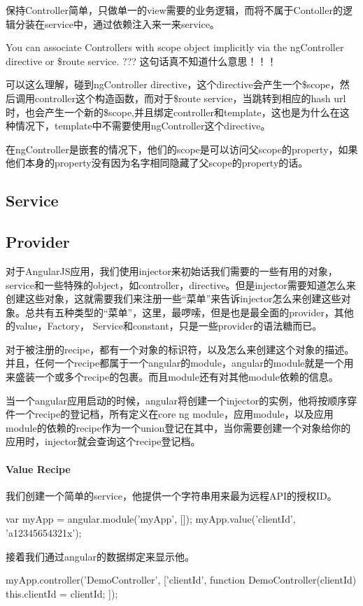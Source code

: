 保持Controller简单，只做单一的view需要的业务逻辑，而将不属于Contoller的逻辑分装在service中，通过依赖注入来一来service。

You can associate Controllers with scope object implicitly via the ngController directive or \$route service. ??? 这句话真不知道什么意思！！！

可以这么理解，碰到ngController directive，这个directive会产生一个\$scope，然后调用controller这个构造函数，而对于\$route service，当跳转到相应的hash url时，也会产生一个新的\$scope,并且绑定controller和template，这也是为什么在这种情况下，template中不需要使用ngController这个directive。

在ngController是嵌套的情况下，他们的scope是可以访问父scope的property，如果他们本身的property没有因为名字相同隐藏了父scope的property的话。


\subsection{Service}

\subsection{Provider}

对于AngularJS应用，我们使用injector来初始话我们需要的一些有用的对象，service和一些特殊的object，如controller，directive。但是injector需要知道怎么来创建这些对象，这就需要我们来注册一些``菜单''来告诉injector怎么来创建这些对象。总共有五种类型的``菜单''，这里，最啰嗦，但是也是最全面的provider，其他的value，Factory， Service和constant，只是一些provider的语法糖而已。

对于被注册的recipe，都有一个对象的标识符，以及怎么来创建这个对象的描述。并且，任何一个recipe都属于一个angular的module，angular的module就是一个用来盛装一个或多个recipe的包裹。而且module还有对其他module依赖的信息。

当一个angular应用启动的时候，angular将创建一个injector的实例，他将按顺序穿件一个recipe的登记档，所有定义在core ng module，应用module，以及应用module的依赖的recipe作为一个union登记在其中，当你需要创建一个对象给你的应用时，injector就会查询这个recipe登记档。

\paragraph{Value Recipe}

我们创建一个简单的service，他提供一个字符串用来最为远程API的授权ID。
\begin{JavaScript}
var myApp = angular.module('myApp', []);
myApp.value('clientId', 'a12345654321x');
\end{JavaScript}
接着我们通过angular的数据绑定来显示他。
\begin{JavaScript}
myApp.controller('DemoController', ['clientId', function DemoController(clientId) {
	this.clientId = clientId;
}]);
\end{JavaScript}


